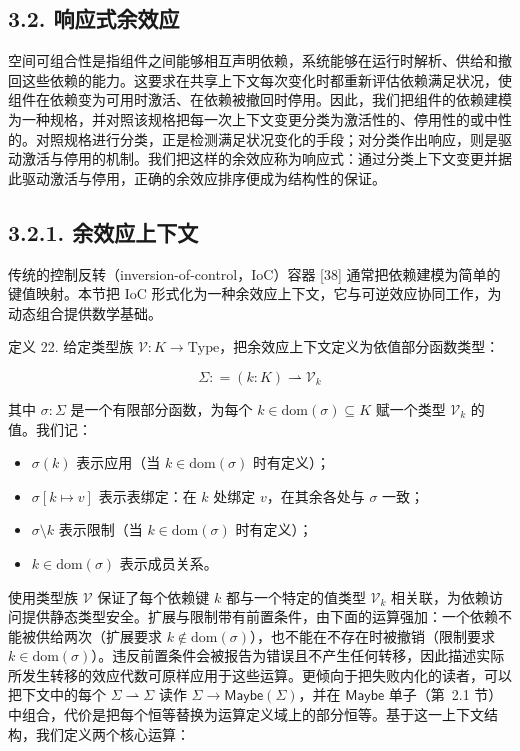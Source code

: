 \subsection{3.2. 响应式余效应}\label{reactive-coefects}

空间可组合性是指组件之间能够相互声明依赖，系统能够在运行时解析、供给和撤回这些依赖的能力。这要求在共享上下文每次变化时都重新评估依赖满足状况，使组件在依赖变为可用时激活、在依赖被撤回时停用。因此，我们把组件的依赖建模为一种规格，并对照该规格把每一次上下文变更分类为激活性的、停用性的或中性的。对照规格进行分类，正是检测满足状况变化的手段；对分类作出响应，则是驱动激活与停用的机制。我们把这样的余效应称为响应式：通过分类上下文变更并据此驱动激活与停用，正确的余效应排序便成为结构性的保证。

\subsection{3.2.1. 余效应上下文}\label{coefect-context}

传统的控制反转（inversion-of-control，IoC）容器 {[}38{]} 通常把依赖建模为简单的键值映射。本节把 IoC 形式化为一种余效应上下文，它与可逆效应协同工作，为动态组合提供数学基础。

定义 22. 给定类型族 \(\mathcal { V } : K \to \mathrm { T y p e }\)，把余效应上下文定义为依值部分函数类型：

\[
\Sigma : = ( k : K ) \rightharpoonup \mathcal { V } _ { k }\tag{20}
\]

其中 \(\sigma : \Sigma\) 是一个有限部分函数，为每个 \(k \in \mathrm { d o m } ( \sigma ) \subseteq K\) 赋一个类型 \(\mathcal { V } _ { k }\) 的值。我们记：

\begin{itemize}
\item \(\sigma ( k )\) 表示应用（当 \(k \in \mathrm { d o m } ( \sigma )\) 时有定义）；
\item \(\sigma [ k \mapsto v ]\) 表示表绑定：在 \(k\) 处绑定 \(v\)，在其余各处与 \(\sigma\) 一致；
\item \(\sigma \setminus k\) 表示限制（当 \(k \in \mathrm { d o m } ( \sigma )\) 时有定义）；
\item \(k \in \mathrm { d o m } ( \sigma )\) 表示成员关系。
\end{itemize}

使用类型族 \(\mathcal { V }\) 保证了每个依赖键 \(k\) 都与一个特定的值类型 \(\mathcal { V } _ { k }\) 相关联，为依赖访问提供静态类型安全。扩展与限制带有前置条件，由下面的运算强加：一个依赖不能被供给两次（扩展要求 \(k \notin \mathrm { d o m } ( \sigma )\)），也不能在不存在时被撤销（限制要求 \(k \in \mathrm { d o m } ( \sigma )\)）。违反前置条件会被报告为错误且不产生任何转移，因此描述实际所发生转移的效应代数可原样应用于这些运算。更倾向于把失败内化的读者，可以把下文中的每个 \(\Sigma \rightharpoonup \Sigma\) 读作 \(\Sigma \to \mathsf { Maybe } ( \Sigma )\)，并在 \(\mathsf { Maybe }\) 单子（第~2.1 节）中组合，代价是把每个恒等替换为运算定义域上的部分恒等。基于这一上下文结构，我们定义两个核心运算：

